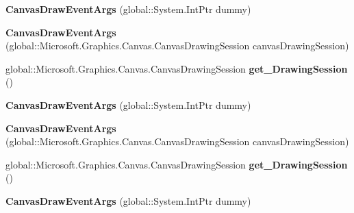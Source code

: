 \begin{DoxyCompactItemize}
{\bfseries Canvas\+Draw\+Event\+Args} (global\+::\+System.\+Int\+Ptr dummy)
\item 
\mbox{\label{class_microsoft_1_1_graphics_1_1_canvas_1_1_u_i_1_1_xaml_1_1_canvas_draw_event_args_a7c611838656ec15a66449dc1811b44b3}} 
{\bfseries Canvas\+Draw\+Event\+Args} (global\+::\+Microsoft.\+Graphics.\+Canvas.\+Canvas\+Drawing\+Session canvas\+Drawing\+Session)
\item 
\mbox{\label{class_microsoft_1_1_graphics_1_1_canvas_1_1_u_i_1_1_xaml_1_1_canvas_draw_event_args_ac6b164ff9cb3ed289d7a835f2548e553}} 
global\+::\+Microsoft.\+Graphics.\+Canvas.\+Canvas\+Drawing\+Session {\bfseries get\+\_\+\+Drawing\+Session} ()
\item 
\mbox{\label{class_microsoft_1_1_graphics_1_1_canvas_1_1_u_i_1_1_xaml_1_1_canvas_draw_event_args_a9e2162ca5b12321e5fdc3e89153e2ea4}} 
{\bfseries Canvas\+Draw\+Event\+Args} (global\+::\+System.\+Int\+Ptr dummy)
\item 
\mbox{\label{class_microsoft_1_1_graphics_1_1_canvas_1_1_u_i_1_1_xaml_1_1_canvas_draw_event_args_a7c611838656ec15a66449dc1811b44b3}} 
{\bfseries Canvas\+Draw\+Event\+Args} (global\+::\+Microsoft.\+Graphics.\+Canvas.\+Canvas\+Drawing\+Session canvas\+Drawing\+Session)
\item 
\mbox{\label{class_microsoft_1_1_graphics_1_1_canvas_1_1_u_i_1_1_xaml_1_1_canvas_draw_event_args_ac6b164ff9cb3ed289d7a835f2548e553}} 
global\+::\+Microsoft.\+Graphics.\+Canvas.\+Canvas\+Drawing\+Session {\bfseries get\+\_\+\+Drawing\+Session} ()
\item 
\mbox{\label{class_microsoft_1_1_graphics_1_1_canvas_1_1_u_i_1_1_xaml_1_1_canvas_draw_event_args_a9e2162ca5b12321e5fdc3e89153e2ea4}} 
{\bfseries Canvas\+Draw\+Event\+Args} (global\+::\+System.\+Int\+Ptr dummy)
\item 

\end{DoxyCompactItemize}
